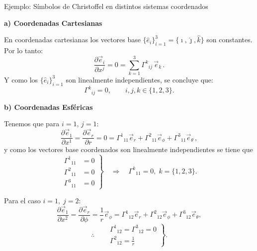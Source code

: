 \documentclass[../apunte_mecanica_clasica.tex]{subfiles}%
\begin{document}
\begin{apuntebloque}{Ejemplo: Símbolos de Christoffel en distintos sistemas coordenados}

\textbf{a) Coordenadas Cartesianas}  

En coordenadas cartesianas los vectores base 
$\{\hat{e}_i\}_{i=1}^3 = \{\hat{\imath}, \hat{\jmath}, \hat{k}\}$ son constantes.  
Por lo tanto:
\begin{equation*}
    \frac{\partial \vec{e}_i}{\partial x^j} = 0
    = \sum_{k=1}^3 \Gamma^k{}_{ij}\, \vec{e}_k \,.
\end{equation*}
Y como los $\{\hat{e}_i\}_{i=1}^3$ son linealmente independientes, se concluye que:
\begin{equation*}
    \Gamma^k{}_{ij} = 0, 
    \qquad i,j,k \in \{1,2,3\}.
\end{equation*}

\bigskip

\textbf{b) Coordenadas Esféricas}  

Tenemos que para $i=1, \,j=1$:
\begin{equation*}
   \frac{\partial \vec{e}_1}{\partial x^1} = \frac{\partial \vec{e}_r}{\partial r} = 0 
    = \Gamma^1{}_{11}\vec{e}_r + \Gamma^2{}_{11}\vec{e}_\phi + \Gamma^3{}_{11}\vec{e}_\theta \,,
\end{equation*}
y como los vectores base coordenados son linealmente independientes se tiene que
\begin{equation*}
\left.
    \begin{aligned}
        \Gamma^1{}_{11}&=0 \\
        \Gamma^2{}_{11}&=0 \\
        \Gamma^3{}_{11}&=0
    \end{aligned}
\right\}    
    \quad \Rightarrow \quad \Gamma^k{}_{11}=0, \; k=\{1,2,3\}.
\end{equation*}

Para el caso $i=1, \; j=2$:
\begin{equation*}
    \frac{\partial \vec{e}_1}{\partial x^2} =\frac{\partial \vec{e}_r}{\partial \phi} = \frac{1}{r}\vec{e}_\phi
    = \Gamma^1{}_{12}\vec{e}_r + \Gamma^2{}_{12}\vec{e}_\phi + \Gamma^3{}_{12}\vec{e}_\theta,
\end{equation*}
\begin{equation*}
    \therefore \quad 
    \left.
    \begin{aligned}
        &\Gamma^1{}_{12} =\Gamma^3{}_{12} = 0 \\
        &\Gamma^2{}_{12} = \tfrac{1}{r}
    \end{aligned}
    \right\}.
\end{equation*}


\end{apuntebloque}
\end{document}
